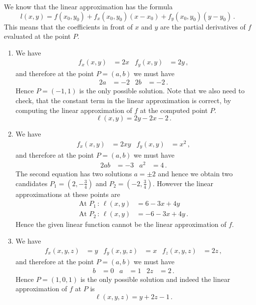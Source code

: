 \begin{solution}
We know that the linear approximation has the formula
\[
l(x,y) = f(x_0,y_0) + f_x(x_0,y_0)(x-x_0) + f_y(x_0,y_0)(y-y_0)\,.
\]
This means that the coefficients in front of $x$ and $y$ are the partial derivatives of $f$ evaluated at the point $P$.

\begin{enumerate}
\item
We have
\begin{align*}
f_x(x,y) &= 2x &
f_y(x,y) &= 2y\,,
\end{align*}
and therefore at the point $P=(a,b)$ we must have
\begin{align*}
2a &= -2 &
2b &= -2\,.
\end{align*}
Hence $P = (-1,1)$ is the only possible solution. Note that we also need to check, that the constant term in the linear approximation is correct, by computing the linear approximation of $f$ at the computed point $P$.
\[
\ell(x,y) = 2y-2x-2\,.
\]

\item
We have
\begin{align*}
f_x(x,y) &= 2xy &
f_y(x,y) &= x^2\,,
\end{align*}
and therefore at the point $P=(a,b)$ we must have
\begin{align*}
2ab &= -3 &
a^2 &= 4\,.
\end{align*}
The second equation has two solutions $a = \pm 2$ and hence we obtain two candidates $P_1=\left(2,-\frac 34\right)$ and $P_2=\left(-2,\frac 34 \right)$. However the linear approximations at these points are
\begin{align*}
\text{At }P_1\,:\, \ell(x,y) &= 6 - 3x + 4y \\
\text{At }P_2\,:\, \ell(x,y) &= -6 - 3x + 4y\,.
\end{align*}
Hence the given linear function cannot be the linear approximation of $f$.

\item
We have
\begin{align*}
f_x(x,y,z) &= y &
f_y(x,y,z) &= x &
f_z(x,y,z) &= 2z\,,
\end{align*}
and therefore at the point $P=(a,b)$ we must have
\begin{align*}
b &= 0 &
a &= 1 &
2z &= 2\,.
\end{align*}
Hence $P=(1,0,1)$ is the only possible solution and indeed the linear approximation of $f$ at $P$ is
\[
\ell(x,y,z) = y+2z-1\,.
\]


\end{enumerate}
\end{solution}
